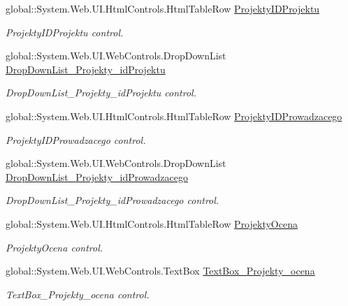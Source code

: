\begin{DoxyCompactItemize}
global\+::\+System.\+Web.\+U\+I.\+Html\+Controls.\+Html\+Table\+Row \hyperlink{class_dziennik_ocen_web2_1_1_web_form1_a2d974557e638f29db410389b93af4cf3}{Projekty\+I\+D\+Projektu}
\begin{DoxyCompactList}\small\item\em Projekty\+I\+D\+Projektu control. \end{DoxyCompactList}\item 
global\+::\+System.\+Web.\+U\+I.\+Web\+Controls.\+Drop\+Down\+List \hyperlink{class_dziennik_ocen_web2_1_1_web_form1_a5a3d84b013408bc386a35d766eb2afdf}{Drop\+Down\+List\+\_\+\+Projekty\+\_\+id\+Projektu}
\begin{DoxyCompactList}\small\item\em Drop\+Down\+List\+\_\+\+Projekty\+\_\+id\+Projektu control. \end{DoxyCompactList}\item 
global\+::\+System.\+Web.\+U\+I.\+Html\+Controls.\+Html\+Table\+Row \hyperlink{class_dziennik_ocen_web2_1_1_web_form1_a7863d38f63d7d921beeadd58950adcbf}{Projekty\+I\+D\+Prowadzacego}
\begin{DoxyCompactList}\small\item\em Projekty\+I\+D\+Prowadzacego control. \end{DoxyCompactList}\item 
global\+::\+System.\+Web.\+U\+I.\+Web\+Controls.\+Drop\+Down\+List \hyperlink{class_dziennik_ocen_web2_1_1_web_form1_acd84cc06850f05e526a1aee42c1a72c5}{Drop\+Down\+List\+\_\+\+Projekty\+\_\+id\+Prowadzacego}
\begin{DoxyCompactList}\small\item\em Drop\+Down\+List\+\_\+\+Projekty\+\_\+id\+Prowadzacego control. \end{DoxyCompactList}\item 
global\+::\+System.\+Web.\+U\+I.\+Html\+Controls.\+Html\+Table\+Row \hyperlink{class_dziennik_ocen_web2_1_1_web_form1_ab0ee54e545af71912658fe0b23a3cdd9}{Projekty\+Ocena}
\begin{DoxyCompactList}\small\item\em Projekty\+Ocena control. \end{DoxyCompactList}\item 
global\+::\+System.\+Web.\+U\+I.\+Web\+Controls.\+Text\+Box \hyperlink{class_dziennik_ocen_web2_1_1_web_form1_aa4ba06f7e833012a4b33e57bc3850a5b}{Text\+Box\+\_\+\+Projekty\+\_\+ocena}
\begin{DoxyCompactList}\small\item\em Text\+Box\+\_\+\+Projekty\+\_\+ocena control. \end{DoxyCompactList}\item 

\end{DoxyCompactItemize}
